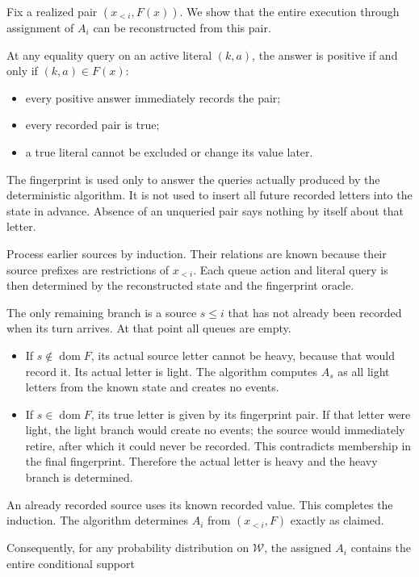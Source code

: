 Fix a realized pair \((x_{<i},F(x))\). We show that the entire execution through assignment of \(A_i\) can be reconstructed from this pair.

At any equality query on an active literal \((k,a)\), the answer is positive if and only if \((k,a)\in F(x)\):

\begin{itemize}
\tightlist
\item
  every positive answer immediately records the pair;
\item
  every recorded pair is true;
\item
  a true literal cannot be excluded or change its value later.
\end{itemize}

The fingerprint is used only to answer the queries actually produced by the deterministic algorithm. It is not used to insert all future recorded letters into the state in advance. Absence of an unqueried pair says nothing by itself about that letter.

Process earlier sources by induction. Their relations are known because their source prefixes are restrictions of \(x_{<i}\). Each queue action and literal query is then determined by the reconstructed state and the fingerprint oracle.

The only remaining branch is a source \(s\le i\) that has not already been recorded when its turn arrives. At that point all queues are empty.

\begin{itemize}
\tightlist
\item
  If \(s\notin\operatorname{dom}F\), its actual source letter cannot be heavy, because that would record it. Its actual letter is light. The algorithm computes \(A_s\) as all light letters from the known state and creates no events.
\item
  If \(s\in\operatorname{dom}F\), its true letter is given by its fingerprint pair. If that letter were light, the light branch would create no events; the source would immediately retire, after which it could never be recorded. This contradicts membership in the final fingerprint. Therefore the actual letter is heavy and the heavy branch is determined.
\end{itemize}

An already recorded source uses its known recorded value. This completes the induction. The algorithm determines \(A_i\) from \((x_{<i},F)\) exactly as claimed.

Consequently, for any probability distribution on \(\mathcal W\), the assigned \(A_i\) contains the entire conditional support

